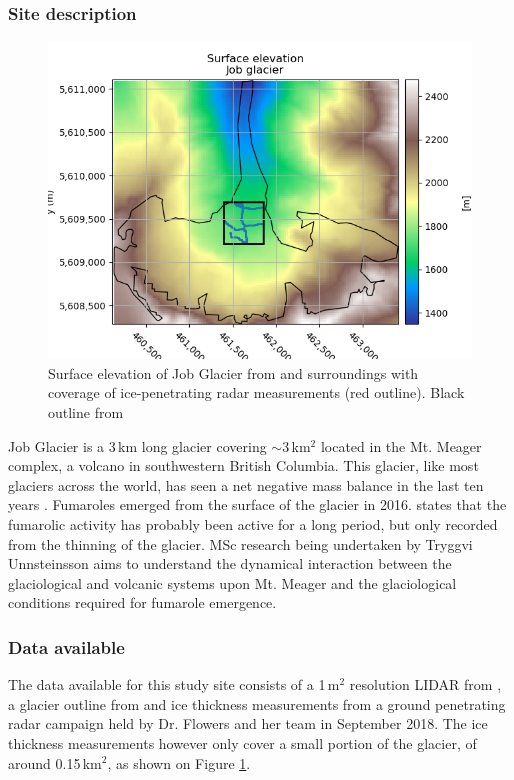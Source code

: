 \documentclass[a4, 12pt]{article}
\begin{document}
\subsubsection{Site description}
\begin{figure}[h!]
\centering
\includegraphics[scale=0.8]{../imgs/Job glacier/elevation.png}
\caption{Surface elevation of Job Glacier from \citet{roberti2018landslides} and surroundings with coverage of ice-penetrating radar measurements (red outline). Black outline from \citet{pfeffer2014randolph}}
\label{fig:job_dem}
\end{figure} %
Job Glacier is a 3\,km long glacier covering $\sim$3\,km$^2$ located in the Mt. Meager complex, a volcano in southwestern British Columbia. This glacier, like most glaciers across the world, has seen a net negative mass balance in the last ten years \citep{reyes2004stratigraphic}. Fumaroles emerged from the surface of the glacier in 2016. \citet{roberti2018landslides}  states that the fumarolic activity has probably been active for a long period, but only recorded from the thinning of the glacier.
MSc research being undertaken by Tryggvi Unnsteinsson aims to understand the dynamical interaction between the glaciological and volcanic systems upon Mt. Meager and the glaciological conditions required for fumarole emergence.
\subsubsection{Data available} %
The data available for this study site consists of a 1\,m$^2$ resolution LIDAR from \citet{roberti2018landslides}, a glacier outline from \cite{pfeffer2014randolph} and ice thickness measurements from a ground penetrating radar campaign held by Dr. Flowers and her team in September 2018. The ice thickness measurements however only cover a small portion of the glacier, of around 0.15\,km$^2$, as shown on Figure \ref{fig:job_dem}.\\
\FloatBarrier
\end{document}
